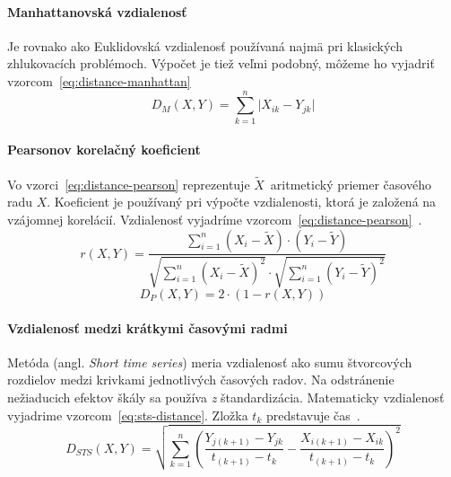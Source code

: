 \documentclass[a4paper,twoside,slovak,12pt,appendix]{article}
\begin{document}
\paragraph{Manhattanovská vzdialenosť}
Je rovnako ako Euklidovská vzdialenosť používaná najmä pri klasických
zhlukovacích problémoch. Výpočet je tiež veľmi podobný, môžeme ho vyjadriť
vzorcom~\ref{eq:distance-manhattan}
\begin{equation}
	\label{eq:distance-manhattan}
  D_M \left( X, Y \right) = \sum_{k=1}^{n} \lvert X_{ik} - Y_{jk} \rvert
\end{equation}

\paragraph{Pearsonov korelačný koeficient}
Vo vzorci~\ref{eq:distance-pearson} reprezentuje $\widetilde{X}$~aritmetický
priemer časového radu $X$. Koeficient je používaný pri výpočte vzdialenosti,
ktorá je založená na vzájomnej korelácií. Vzdialenosť vyjadríme
vzorcom~\ref{eq:distance-pearson}~\cite{WarrenLiao2005}.
\begin{equation}
	\label{eq:distance-pearson}
  r \left( X, Y \right) = \frac
  { \sum_{i=1}^{n} \left( X_{i} - \widetilde{X} \right) \cdot \left( Y_{i} - \widetilde{Y} \right) }
  { \sqrt{\sum_{i=1}^{n} \left( X_{i} - \widetilde{X} \right)^2 } \cdot \sqrt{\sum_{i=1}^{n} \left( Y_{i} - \widetilde{Y} \right)^2 } }
\end{equation}
\begin{equation}
	\label{eq:distance-golay}
  D_P \left( X, Y \right) = 2 \cdot \left( 1 - r \left( X, Y \right) \right)
\end{equation}

\paragraph{Vzdialenosť medzi krátkymi časovými radmi}
Metóda (angl. \textit{Short time series}) meria vzdialenosť ako sumu štvorcových
rozdielov medzi krivkami jednotlivých časových radov. Na odstránenie nežiaducich
efektov škály sa používa \textit{z} štandardizácia. Matematicky vzdialenosť
vyjadrime vzorcom~\ref{eq:sts-distance}. Zložka $t_k$ predstavuje
čas~\cite{WarrenLiao2005}.
\begin{equation}
	\label{eq:sts-distance}
  D_{STS} \left( X, Y \right) = \sqrt{ \sum_{k=1}^{n} \left(
    \frac{Y_{j \left( k+1 \right)} - Y_{jk}}{t_{\left( k+1 \right)} - t_k} -
    \frac{X_{i \left( k+1 \right)} - X_{ik}}{t_{\left( k+1 \right)} - t_k}
   \right)^2 }
\end{equation}
\end{document}

